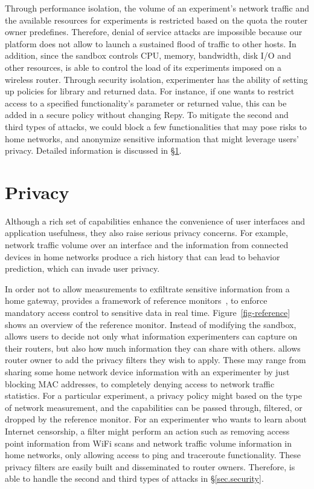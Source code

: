 Through performance isolation, the volume of an experiment's network traffic and the available resources for experiments is restricted based on the quota the router owner predefines. Therefore, denial of service attacks are impossible because our platform does not allow to launch a sustained flood of traffic to other hosts. In addition, since the sandbox controls CPU, memory, bandwidth, disk I/O and other resources, \sysname is able to control the load of its experiments imposed on a wireless router. Through security isolation, experimenter has the ability of setting up policies for library and returned data. For instance, if one wants to restrict access to a specified functionality's parameter or returned value, this can be added in a secure policy without changing Repy. To mitigate the second and third types of attacks, we could block a few functionalities that may pose risks to home networks, and anonymize sensitive information that might leverage users' privacy. Detailed information is discussed in \S{\ref{sec.privacy}}. 

\section{Privacy}
\label{sec.privacy}
Although a rich set of capabilities enhance the convenience of user interfaces and application usefulness, they also raise serious privacy concerns. For example, network traffic volume over an interface and the information from connected devices in home networks produce a rich history that can lead to behavior prediction, which can invade user privacy. 

In order not to allow measurements to exfiltrate sensitive information from a home gateway, \sysname provides a framework of reference monitors~\cite{ref}, to enforce mandatory access control to sensitive data in real time. Figure~\ref{fig-reference} shows an overview of the reference monitor. Instead of modifying the sandbox, \sysname allows users to decide not only what information experimenters can capture on their routers, but also how much information they can share with others. \sysname allows router owner to add the privacy filters they wish to apply. These may range from sharing some home network device information with an experimenter by just blocking MAC addresses, to completely denying access to network traffic statistics. For a particular experiment, a privacy policy might based on the type of network measurement, and the capabilities can be passed through, filtered, or dropped by the reference monitor. For an experimenter who wants to learn about Internet censorship, a filter might perform an action such as removing access point information from WiFi scans and network traffic volume information in home networks, only allowing access to ping and traceroute functionality. These privacy filters are easily built and disseminated to router owners. Therefore, \sysname is able to handle the second and third types of attacks in \S{\ref{sec.security}}. 

